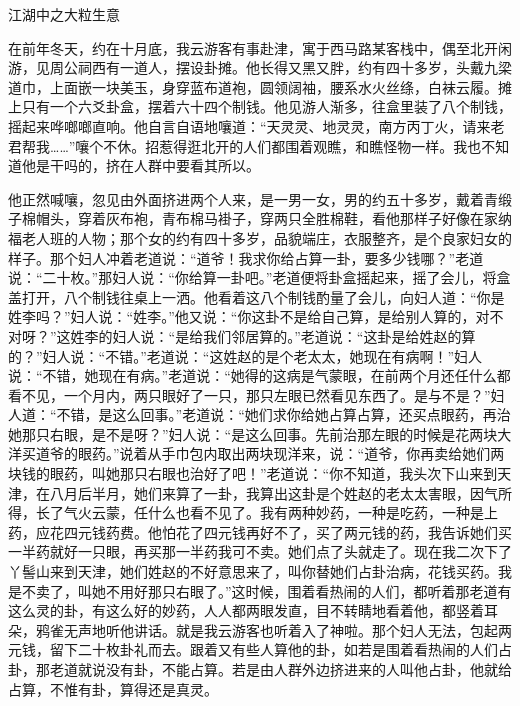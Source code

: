 \documentclass[12pt,UTF8]{ctexbook}
\begin{document}
江湖中之大粒生意


在前年冬天，约在十月底，我云游客有事赴津，寓于西马路某客栈中，偶至北开闲游，见周公祠西有一道人，摆设卦摊。他长得又黑又胖，约有四十多岁，头戴九梁道巾，上面嵌一块美玉，身穿蓝布道袍，圆领阔袖，腰系水火丝绦，白袜云履。摊上只有一个六爻卦盒，摆着六十四个制钱。他见游人渐多，往盒里装了八个制钱，摇起来哗啷啷直响。他自言自语地嚷道：“天灵灵、地灵灵，南方丙丁火，请来老君帮我……”嚷个不休。招惹得逛北开的人们都围着观瞧，和瞧怪物一样。我也不知道他是干吗的，挤在人群中要看其所以。

他正然喊嚷，忽见由外面挤进两个人来，是一男一女，男的约五十多岁，戴着青缎子棉帽头，穿着灰布袍，青布棉马褂子，穿两只全胜棉鞋，看他那样子好像在家纳福老人班的人物；那个女的约有四十多岁，品貌端庄，衣服整齐，是个良家妇女的样子。那个妇人冲着老道说：“道爷！我求你给占算一卦，要多少钱哪？”老道说：“二十枚。”那妇人说：“你给算一卦吧。”老道便将卦盒摇起来，摇了会儿，将盒盖打开，八个制钱往桌上一洒。他看着这八个制钱酌量了会儿，向妇人道：“你是姓李吗？”妇人说：“姓李。”他又说：“你这卦不是给自己算，是给别人算的，对不对呀？”这姓李的妇人说：“是给我们邻居算的。”老道说：“这卦是给姓赵的算的？”妇人说：“不错。”老道说：“这姓赵的是个老太太，她现在有病啊！”妇人说：“不错，她现在有病。”老道说：“她得的这病是气蒙眼，在前两个月还任什么都看不见，一个月内，两只眼好了一只，那只左眼已然看见东西了。是与不是？”妇人道：“不错，是这么回事。”老道说：“她们求你给她占算占算，还买点眼药，再治她那只右眼，是不是呀？”妇人说：“是这么回事。先前治那左眼的时候是花两块大洋买道爷的眼药。”说着从手巾包内取出两块现洋来，说：“道爷，你再卖给她们两块钱的眼药，叫她那只右眼也治好了吧！”老道说：“你不知道，我头次下山来到天津，在八月后半月，她们来算了一卦，我算出这卦是个姓赵的老太太害眼，因气所得，长了气火云蒙，任什么也看不见了。我有两种妙药，一种是吃药，一种是上药，应花四元钱药费。他怕花了四元钱再好不了，买了两元钱的药，我告诉她们买一半药就好一只眼，再买那一半药我可不卖。她们点了头就走了。现在我二次下了丫髻山来到天津，她们姓赵的不好意思来了，叫你替她们占卦治病，花钱买药。我是不卖了，叫她不用好那只右眼了。”这时候，围着看热闹的人们，都听着那老道有这么灵的卦，有这么好的妙药，人人都两眼发直，目不转睛地看着他，都竖着耳朵，鸦雀无声地听他讲话。就是我云游客也听着入了神啦。那个妇人无法，包起两元钱，留下二十枚卦礼而去。跟着又有些人算他的卦，如若是围着看热闹的人们占卦，那老道就说没有卦，不能占算。若是由人群外边挤进来的人叫他占卦，他就给占算，不惟有卦，算得还是真灵。
\end{document}

